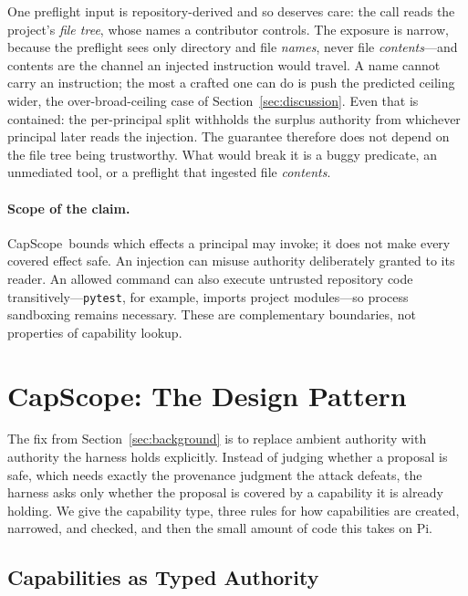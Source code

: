 \documentclass[sigplan,review,anonymous]{acmart}
\newcommand{\tool}{CapScope\xspace}
\begin{document}
  One preflight input is repository-derived and so deserves care: the call reads
  the project's \emph{file tree}, whose names a contributor controls. The
  exposure is narrow, because the preflight sees only directory and file
  \emph{names}, never file \emph{contents}---and contents are the channel an
  injected instruction would travel. A name cannot carry an instruction; the most
  a crafted one can do is push the predicted ceiling wider, the
  over-broad-ceiling case of Section~\ref{sec:discussion}. Even that is
  contained: the per-principal split withholds the surplus authority from
  whichever principal later reads the injection. The guarantee therefore does not
  depend on the file tree being trustworthy. What would break it is a buggy
  predicate, an unmediated tool, or a preflight that ingested file
  \emph{contents}.

  \paragraph{Scope of the claim.}
  \tool\ bounds which effects a principal may invoke; it does not make every
  covered effect safe. An injection can misuse authority deliberately granted to
  its reader. An allowed command can also execute untrusted repository code
  transitively---\texttt{pytest}, for example, imports project modules---so
  process sandboxing remains necessary. These are complementary boundaries, not
  properties of capability lookup.

  \section{\tool: The Design Pattern}
  \label{sec:promptcap}
  
  The fix from Section~\ref{sec:background} is to replace ambient authority
  with authority the harness holds explicitly. Instead of judging whether a
  proposal is safe, which needs exactly the provenance judgment the attack
  defeats, the harness asks only whether the proposal is covered by a
  capability it is already holding. We give the capability type, three rules
  for how capabilities are created, narrowed, and checked, and then the small
  amount of code this takes on Pi.
  
  \subsection{Capabilities as Typed Authority}
  \label{sec:captype}
  
\end{document}
